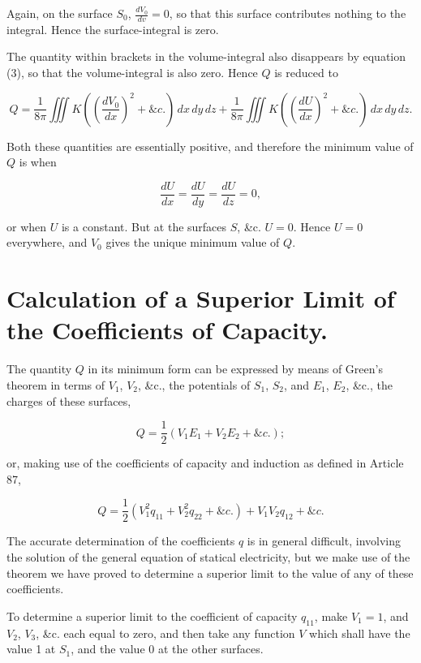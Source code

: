 \documentclass[11pt,a4paper]{article}
\begin{document}
Again, on the surface $S_0$, $\frac{dV_0}{dv}=0$, so that this surface contributes nothing to the integral. Hence the surface-integral is zero.

The quantity within brackets in the volume-integral also disappears by equation (3), so that the volume-integral is also zero. Hence $Q$ is reduced to

\begin{equation}\tag{7}
Q=\frac{1}{8\pi}\iiint K\left(\left(\frac{dV_0}{dx}\right)^2+\&c.\right)\,dx\,dy\,dz
+\frac{1}{8\pi}\iiint K\left(\left(\frac{dU}{dx}\right)^2+\&c.\right)\,dx\,dy\,dz.
\end{equation}

Both these quantities are essentially positive, and therefore the minimum value of $Q$ is when

\begin{equation}\tag{8}
\frac{dU}{dx}=\frac{dU}{dy}=\frac{dU}{dz}=0,
\end{equation}

or when $U$ is a constant. But at the surfaces $S$, \&c. $U=0$. Hence $U=0$ everywhere, and $V_0$ gives the unique minimum value of $Q$.

\section*{Calculation of a Superior Limit of the Coefficients of Capacity.}

The quantity $Q$ in its minimum form can be expressed by means of Green's theorem in terms of $V_1$, $V_2$, \&c., the potentials of $S_1$, $S_2$, and $E_1$, $E_2$, \&c., the charges of these surfaces,

\begin{equation}\tag{9}
Q=\frac{1}{2}(V_1E_1+V_2E_2+\&c.);
\end{equation}

or, making use of the coefficients of capacity and induction as defined in Article 87,

\begin{equation}\tag{10}
Q=\frac{1}{2}(V_1^2q_{11}+V_2^2q_{22}+\&c.)+V_1V_2q_{12}+\&c.
\end{equation}

The accurate determination of the coefficients $q$ is in general difficult, involving the solution of the general equation of statical electricity, but we make use of the theorem we have proved to determine a superior limit to the value of any of these coefficients.

To determine a superior limit to the coefficient of capacity $q_{11}$, make $V_1=1$, and $V_2$, $V_3$, \&c. each equal to zero, and then take any function $V$ which shall have the value 1 at $S_1$, and the value 0 at the other surfaces.
\end{document}
